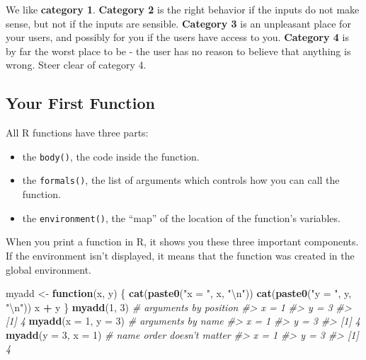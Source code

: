 \documentclass[]{book}
\newenvironment{Shaded}{\begin{snugshade}}{\end{snugshade}}
\newcommand{\CharTok}[1]{\textcolor[rgb]{0.31,0.60,0.02}{#1}}
\newcommand{\CommentTok}[1]{\textcolor[rgb]{0.56,0.35,0.01}{\textit{#1}}}
\newcommand{\ControlFlowTok}[1]{\textcolor[rgb]{0.13,0.29,0.53}{\textbf{#1}}}
\newcommand{\DataTypeTok}[1]{\textcolor[rgb]{0.13,0.29,0.53}{#1}}
\newcommand{\DecValTok}[1]{\textcolor[rgb]{0.00,0.00,0.81}{#1}}
\newcommand{\KeywordTok}[1]{\textcolor[rgb]{0.13,0.29,0.53}{\textbf{#1}}}
\newcommand{\NormalTok}[1]{#1}
\newcommand{\OperatorTok}[1]{\textcolor[rgb]{0.81,0.36,0.00}{\textbf{#1}}}
\newcommand{\StringTok}[1]{\textcolor[rgb]{0.31,0.60,0.02}{#1}}
\theoremstyle{definition}
\theoremstyle{definition}
\theoremstyle{definition}
\theoremstyle{remark}
\begin{document}
We like \textbf{category 1}. \textbf{Category 2} is the right behavior
if the inputs do not make sense, but not if the inputs are sensible.
\textbf{Category 3} is an unpleasant place for your users, and possibly
for you if the users have access to you. \textbf{Category 4} is by far
the worst place to be - the user has no reason to believe that anything
is wrong. Steer clear of category 4.

\hypertarget{your-first-function}{%
\subsection{Your First Function}\label{your-first-function}}

All R functions have three parts:

\begin{itemize}
\item
  the \texttt{body()}, the code inside the function.
\item
  the \texttt{formals()}, the list of arguments which controls how you
  can call the function.
\item
  the \texttt{environment()}, the ``map'' of the location of the
  function's variables.
\end{itemize}

When you print a function in R, it shows you these three important
components. If the environment isn't displayed, it means that the
function was created in the global environment.

\begin{Shaded}
\begin{Highlighting}[]
\NormalTok{myadd <-}\StringTok{ }\ControlFlowTok{function}\NormalTok{(x, y) \{}
  \KeywordTok{cat}\NormalTok{(}\KeywordTok{paste0}\NormalTok{(}\StringTok{"x = "}\NormalTok{, x, }\StringTok{"}\CharTok{\textbackslash{}n}\StringTok{"}\NormalTok{))}
  \KeywordTok{cat}\NormalTok{(}\KeywordTok{paste0}\NormalTok{(}\StringTok{"y = "}\NormalTok{, y, }\StringTok{"}\CharTok{\textbackslash{}n}\StringTok{"}\NormalTok{))}
\NormalTok{  x }\OperatorTok{+}\StringTok{ }\NormalTok{y}
\NormalTok{\}}
\KeywordTok{myadd}\NormalTok{(}\DecValTok{1}\NormalTok{, }\DecValTok{3}\NormalTok{)            }\CommentTok{# arguments by position}
\CommentTok{#> x = 1}
\CommentTok{#> y = 3}
\CommentTok{#> [1] 4}
\KeywordTok{myadd}\NormalTok{(}\DataTypeTok{x =} \DecValTok{1}\NormalTok{, }\DataTypeTok{y =} \DecValTok{3}\NormalTok{)    }\CommentTok{# arguments by name}
\CommentTok{#> x = 1}
\CommentTok{#> y = 3}
\CommentTok{#> [1] 4}
\KeywordTok{myadd}\NormalTok{(}\DataTypeTok{y =} \DecValTok{3}\NormalTok{, }\DataTypeTok{x =} \DecValTok{1}\NormalTok{)    }\CommentTok{# name order doesn't matter}
\CommentTok{#> x = 1}
\CommentTok{#> y = 3}
\CommentTok{#> [1] 4}
\end{Highlighting}
\end{Shaded}
\end{document}
